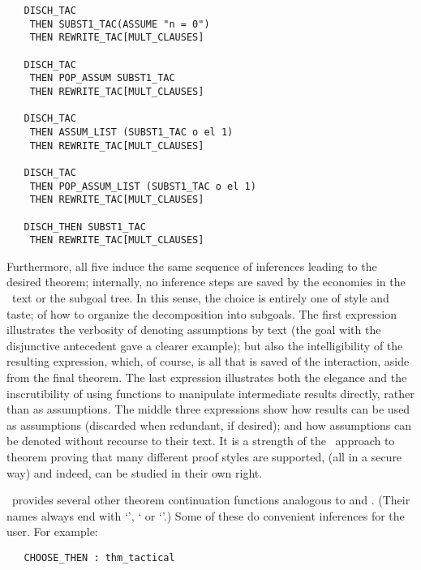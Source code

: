 {\begin{hol}
\begin{verbatim}
   DISCH_TAC 
    THEN SUBST1_TAC(ASSUME "n = 0") 
    THEN REWRITE_TAC[MULT_CLAUSES]

   DISCH_TAC 
    THEN POP_ASSUM SUBST1_TAC 
    THEN REWRITE_TAC[MULT_CLAUSES]

   DISCH_TAC 
    THEN ASSUM_LIST (SUBST1_TAC o el 1) 
    THEN REWRITE_TAC[MULT_CLAUSES]

   DISCH_TAC 
    THEN POP_ASSUM_LIST (SUBST1_TAC o el 1) 
    THEN REWRITE_TAC[MULT_CLAUSES]

   DISCH_THEN SUBST1_TAC 
    THEN REWRITE_TAC[MULT_CLAUSES]
\end{verbatim}\end{hol}

\noindent Furthermore, all five induce the
same sequence of inferences leading to
the desired theorem; internally, no inference steps are saved by the
economies in the \ML\ text or the subgoal tree.  In this sense,
the choice is entirely one of style and taste;
of how to organize the decomposition into subgoals.
The first expression illustrates the verbosity of denoting
assumptions by text (the goal with the
disjunctive antecedent gave a clearer
example); but also
the intelligibility of the resulting expression, which, of course, is all
that is saved of the interaction, aside from the final theorem.
The last expression
illustrates both the elegance and the inscrutibility of
using functions to manipulate intermediate results directly, rather than
as assumptions.
The middle three expressions
show how results can be used as assumptions (discarded when
redundant, if desired); and how
assumptions can be denoted without
recourse to their text.
It is a strength of the \LCF\ approach
 to
theorem proving that many different proof styles are supported,
(all in a secure way) and indeed, can be studied in their own
right.

\HOL\ provides several other theorem continuation functions analogous to
 and .
(Their names always end with
`', ` or `'.) 
Some of these do convenient inferences for the user.
For example:

\begin{boxed}\begin{verbatim}
   CHOOSE_THEN : thm_tactical
\end{verbatim}\end{boxed}

}
